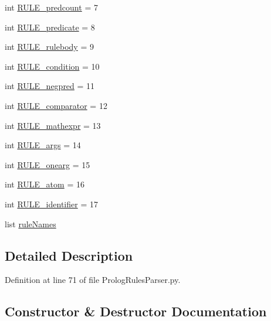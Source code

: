 \begin{DoxyCompactItemize}
\item 
int \hyperlink{class_prolog_rules_parser_1_1_prolog_rules_parser_af5635e81bdacbddb983515a39a661e56}{R\+U\+L\+E\+\_\+predcount} = 7
\item 
int \hyperlink{class_prolog_rules_parser_1_1_prolog_rules_parser_acaa0ad440cba170a8586f0d78a6bf7e2}{R\+U\+L\+E\+\_\+predicate} = 8
\item 
int \hyperlink{class_prolog_rules_parser_1_1_prolog_rules_parser_acd27c1d066aeef36840d89aaaaa79795}{R\+U\+L\+E\+\_\+rulebody} = 9
\item 
int \hyperlink{class_prolog_rules_parser_1_1_prolog_rules_parser_a463b1479e7f7ca4a5b98baad5468647d}{R\+U\+L\+E\+\_\+condition} = 10
\item 
int \hyperlink{class_prolog_rules_parser_1_1_prolog_rules_parser_ae0a9da93cf53d677949708f3ee1eba91}{R\+U\+L\+E\+\_\+negpred} = 11
\item 
int \hyperlink{class_prolog_rules_parser_1_1_prolog_rules_parser_ac54d4c950a548415336043b3dd865d7d}{R\+U\+L\+E\+\_\+comparator} = 12
\item 
int \hyperlink{class_prolog_rules_parser_1_1_prolog_rules_parser_a4d406406107dbe459fb2c3de8cf5e3b8}{R\+U\+L\+E\+\_\+mathexpr} = 13
\item 
int \hyperlink{class_prolog_rules_parser_1_1_prolog_rules_parser_a5280a17312cf9ff3026589fbe178c8c8}{R\+U\+L\+E\+\_\+args} = 14
\item 
int \hyperlink{class_prolog_rules_parser_1_1_prolog_rules_parser_a0d30f19f3b36d3c49b90787774d3124a}{R\+U\+L\+E\+\_\+onearg} = 15
\item 
int \hyperlink{class_prolog_rules_parser_1_1_prolog_rules_parser_a691f884125527c3a3c0c0546d0b9026f}{R\+U\+L\+E\+\_\+atom} = 16
\item 
int \hyperlink{class_prolog_rules_parser_1_1_prolog_rules_parser_a835070742e48135fee80dcece6bc2902}{R\+U\+L\+E\+\_\+identifier} = 17
\item 
list \hyperlink{class_prolog_rules_parser_1_1_prolog_rules_parser_a0faf0fd8785bbe611ec4bc517ca0387a}{rule\+Names}
\end{DoxyCompactItemize}


\subsection{Detailed Description}


Definition at line 71 of file Prolog\+Rules\+Parser.\+py.



\subsection{Constructor \& Destructor Documentation}
\hypertarget{class_prolog_rules_parser_1_1_prolog_rules_parser_a5b5dedde829a4a6dc45c225465d3f51c}{}
